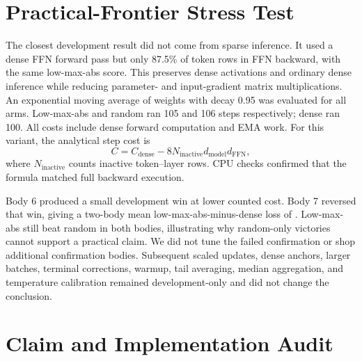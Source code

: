 \documentclass{article}
\begin{document}
\section{Practical-Frontier Stress Test}
\label{app:frontier}

The closest development result did not come from sparse inference. It used a
dense FFN forward pass but only 87.5\% of token rows in FFN backward, with the
same low-max-abs score. This preserves dense activations and ordinary dense
inference while reducing parameter- and input-gradient matrix multiplications.
An exponential moving average of weights with decay 0.95 was evaluated for all
arms. Low-max-abs and random ran 105 and 106 steps respectively; dense ran 100.
All costs include dense forward computation and EMA work. For this variant,
the analytical step cost is
\begin{equation}
C=C_{\mathrm{dense}}-8N_{\mathrm{inactive}}d_{\mathrm{model}}d_{\mathrm{FFN}},
\end{equation}
where $N_{\mathrm{inactive}}$ counts inactive token--layer rows. CPU checks
confirmed that the formula matched full backward execution.

\begin{table}[h]
\centering
\caption{Near-dense update-sparsity stress test with EMA. Values are ordinary
dense held-out loss. Costs are corrected total training-plus-EMA FLOPs in
trillions. Body 6 was used for extensive development and is not independent
confirmation. Body 7 used the frozen protocol and the same held-out seed as
body 6, so this is body-level rather than independent-dataset replication.}
\label{tab:frontier}
{\small\frontierstresstable}
\end{table}

Body 6 produced a small development win at lower counted cost. Body 7 reversed
that win, giving a two-body mean low-max-abs-minus-dense loss of
\FrontierTwoBodyGap. Low-max-abs still beat random in both bodies, illustrating
why random-only victories cannot support a practical claim. We did not tune the
failed confirmation or shop additional confirmation bodies. Subsequent scaled
updates, dense anchors, larger batches, terminal corrections, warmup, tail
averaging, median aggregation, and temperature calibration remained
development-only and did not change the conclusion.

\section{Claim and Implementation Audit}
\label{app:audit}
\end{document}
